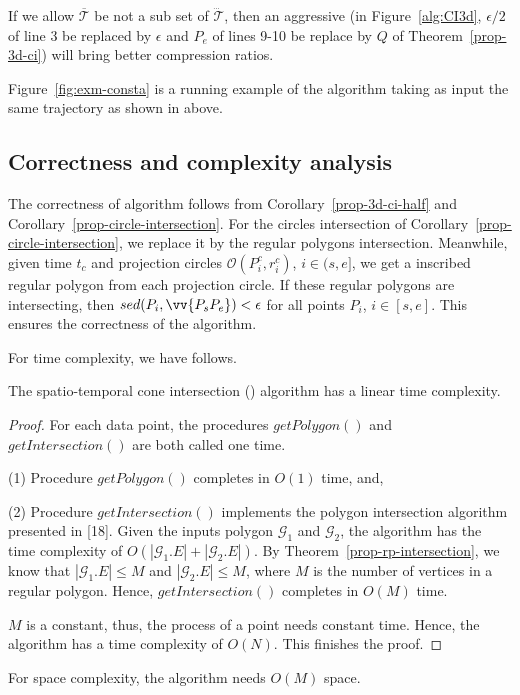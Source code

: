 If we allow $\overline{\mathcal{T}}$ be not a sub set of $\dddot{\mathcal{T}}$, then an aggressive \cist (\ie in Figure~\ref{alg:CI3d}, $\epsilon/2$ of line 3 be replaced by $\epsilon$ and $P_e$ of lines 9-10 be replace by $Q$ of Theorem~\ref{prop-3d-ci}) will bring better compression ratios.

\begin{example}
\label{exm-alg-conesta}
Figure~\ref{fig:exm-consta} is a running example of the \cista algorithm taking as input the same trajectory as shown in above.
\end{example}


\subsection{Correctness and complexity analysis}

The correctness of algorithm \cist follows from Corollary~\ref{prop-3d-ci-half} and Corollary~\ref{prop-circle-intersection}. For the circles intersection of Corollary~\ref{prop-circle-intersection}, we replace it by the regular polygons intersection.
Meanwhile, given time $t_c$ and projection circles $\mathcal{O}(P^c_i, r^c_i)$, $i \in (s, e]$, we get a inscribed regular polygon from each projection circle.
If these regular polygons are intersecting, then $sed(P_i, \vv{P_sP_e})<\epsilon$ for all points $P_i$, $i \in [s,e]$.
This ensures the correctness of the algorithm.


For time complexity, we have follows.





\begin{theorem}
\label{prop-cist-complexity}
The spatio-temporal cone intersection (\cist) algorithm has a linear time complexity.
\end{theorem}

\begin{proof}
For each data point, the procedures $getPolygon()$ and $getIntersection()$ are both called one time.

\hspace{-2ex}(1) Procedure $getPolygon()$ completes in $O(1)$ time, and,

\hspace{-2ex}(2) Procedure $getIntersection()$ implements the polygon intersection algorithm presented in [18]. Given the inputs polygon $\mathcal{G}_1$ and $\mathcal{G}_2$, the algorithm has the time complexity of $O(|\mathcal{G}_1.E| + |\mathcal{G}_2.E|)$. By Theorem~\ref{prop-rp-intersection}, we know that $|\mathcal{G}_1.E| \le M$ and $|\mathcal{G}_2.E|\le M$, where $M$ is the number of vertices in a regular polygon. Hence, $getIntersection()$ completes in $O(M)$ time.

$M$ is a constant, thus, the process of a point needs constant time. Hence, the algorithm has a time complexity of $O(N)$.
This finishes the proof.
\end{proof}


{For space complexity, the algorithm needs $O(M)$ space.}

